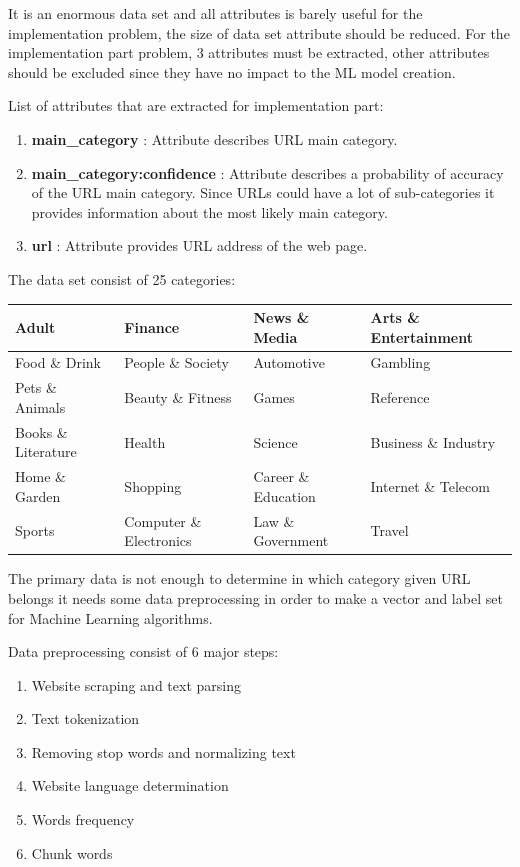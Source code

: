 It is an enormous data set and all attributes is barely useful for the implementation problem, the size of data set attribute should be reduced. For the implementation part problem, 3 attributes must be extracted, other attributes should be excluded since they have no impact to the ML model creation. 

List of attributes that are extracted for implementation part:
\begin{enumerate}
    \item \textbf{main\_category} : Attribute describes URL main category.
    \item \textbf{main\_category:confidence} : Attribute describes a probability of accuracy of the URL main category. Since URLs could have a lot of sub-categories it provides information about the most likely main category.
    \item \textbf{url} : Attribute provides URL address of the web page.
\end{enumerate}

\label{sec:categoriesSet}
The data set consist of 25 categories:
\begin{table}[H]
    \begin{tabular}{| l | l | l | l |}
        \hline
         Adult & Finance & News \& Media & Arts \& Entertainment   \\ \hline
         Food \& Drink & People \& Society & Automotive & Gambling   \\ \hline
         Pets \& Animals & Beauty \& Fitness & Games & Reference   \\ \hline
         Books \& Literature & Health & Science & Business \& Industry  \\ \hline
         Home \& Garden & Shopping & Career \& Education & Internet \& Telecom  \\ \hline
         Sports & Computer \& Electronics & Law \& Government & Travel\\ \hline
    \end{tabular}
\label{table: categories_table}
\end{table}


The primary data is not enough to determine in which category given URL belongs it needs some data preprocessing in order to make a vector and label set for Machine Learning algorithms. 

Data preprocessing consist of 6 major steps:
\begin{enumerate}
    \item Website scraping and text parsing
    \item Text tokenization
    \item Removing stop words and normalizing text
    \item Website language determination
    \item Words frequency
    \item Chunk words
\end{enumerate}

